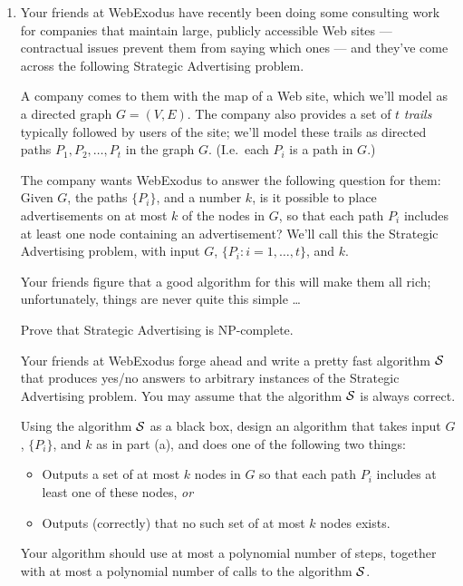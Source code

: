 \documentclass[12pt]{article}
\begin{document}
\begin{enumerate}
{}



\item

Your friends at WebExodus have recently been 
doing some consulting work for companies that
maintain large, publicly accessible Web sites ---
contractual issues prevent them from saying which ones ---
and they've come across the following
{\sc Strategic Advertising} problem.

A company comes to them with the map of a Web site,
which we'll model as a directed graph $G = (V,E)$.
The company also provides a set of $t$ {\em trails}
typically followed by users of the site;
we'll model these trails as directed paths
$P_1, P_2, \ldots, P_t$ in the graph $G$.
(I.e.~each $P_i$ is a path in $G$.)

The company wants WebExodus to answer the following question
for them: Given $G$, the paths $\{P_i\}$, and a number $k$, is
it possible to place advertisements on at most $k$ of the nodes in $G$,
so that each path $P_i$ includes at least one node containing
an advertisement?
We'll call this the {\sc Strategic Advertising} problem,
with input $G$, $\{P_i : i = 1, \ldots, t\}$, and $k$.

Your friends figure that a good algorithm for this will
make them all rich; unfortunately, things are never quite this simple \ldots\

Prove that {\sc Strategic Advertising} is NP-complete.

Your friends at WebExodus forge ahead and write
a pretty fast algorithm $\cal S$ that produces
yes/no answers to arbitrary instances of the
{\sc Strategic Advertising} problem.
You may assume that the algorithm $\cal S$ is always correct.

Using the algorithm $\cal S$ as a black box,
design an algorithm that takes input $G$, $\{P_i\}$, and $k$
as in part (a), and does one of the following two things:
\begin{itemize}
\item Outputs a set of at most $k$ nodes in $G$ so that each path $P_i$
includes at least one of these nodes, {\em or}
\item Outputs (correctly) that no such set of at most $k$ nodes exists.
\end{itemize}
Your algorithm should use at most a polynomial number of steps, together
with at most a polynomial number of calls to the algorithm $\cal S$.


\end{enumerate}
\end{document}
